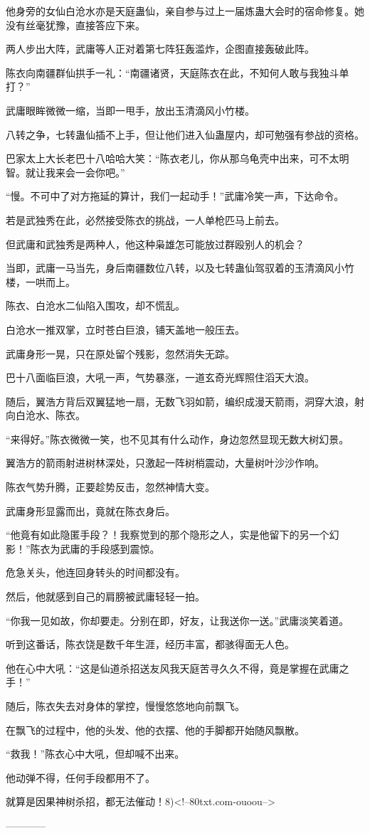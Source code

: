 \begin{this_body}
他身旁的女仙白沧水亦是天庭蛊仙，亲自参与过上一届炼蛊大会时的宿命修复。她没有丝毫犹豫，直接答应下来。

两人步出大阵，武庸等人正对着第七阵狂轰滥炸，企图直接轰破此阵。

陈衣向南疆群仙拱手一礼：“南疆诸贤，天庭陈衣在此，不知何人敢与我独斗单打？”

武庸眼眸微微一缩，当即一甩手，放出玉清滴风小竹楼。

八转之争，七转蛊仙插不上手，但让他们进入仙蛊屋内，却可勉强有参战的资格。

巴家太上大长老巴十八哈哈大笑：“陈衣老儿，你从那乌龟壳中出来，可不太明智。就让我来会一会你吧。”

“慢。不可中了对方拖延的算计，我们一起动手！”武庸冷笑一声，下达命令。

若是武独秀在此，必然接受陈衣的挑战，一人单枪匹马上前去。

但武庸和武独秀是两种人，他这种枭雄怎可能放过群殴别人的机会？

当即，武庸一马当先，身后南疆数位八转，以及七转蛊仙驾驭着的玉清滴风小竹楼，一哄而上。

陈衣、白沧水二仙陷入围攻，却不慌乱。

白沧水一推双掌，立时苍白巨浪，铺天盖地一般压去。

武庸身形一晃，只在原处留个残影，忽然消失无踪。

巴十八面临巨浪，大吼一声，气势暴涨，一道玄奇光辉照住滔天大浪。

随后，翼浩方背后双翼猛地一扇，无数飞羽如箭，编织成漫天箭雨，洞穿大浪，射向白沧水、陈衣。

“来得好。”陈衣微微一笑，也不见其有什么动作，身边忽然显现无数大树幻景。

翼浩方的箭雨射进树林深处，只激起一阵树梢震动，大量树叶沙沙作响。

陈衣气势升腾，正要趁势反击，忽然神情大变。

武庸身形显露而出，竟就在陈衣身后。

“他竟有如此隐匿手段？！我察觉到的那个隐形之人，实是他留下的另一个幻影！”陈衣为武庸的手段感到震惊。

危急关头，他连回身转头的时间都没有。

然后，他就感到自己的肩膀被武庸轻轻一拍。

“你我一见如故，你却要走。分别在即，好友，让我送你一送。”武庸淡笑着道。

听到这番话，陈衣饶是数千年生涯，经历丰富，都骇得面无人色。

他在心中大吼：“这是仙道杀招送友风我天庭苦寻久久不得，竟是掌握在武庸之手！”

随后，陈衣失去对身体的掌控，慢慢悠悠地向前飘飞。

在飘飞的过程中，他的头发、他的衣摆、他的手脚都开始随风飘散。

“救我！”陈衣心中大吼，但却喊不出来。

他动弹不得，任何手段都用不了。

就算是因果神树杀招，都无法催动！8)<!--80txt.com-ouoou-->

------------

\end{this_body}


